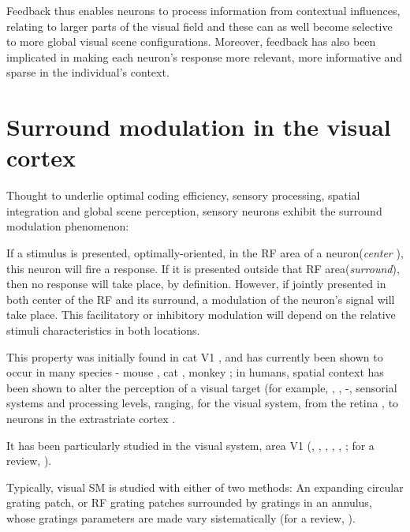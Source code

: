Feedback thus enables neurons to process information from contextual influences, relating to larger parts of the visual field and these can as well become selective to more global visual scene configurations. Moreover, feedback has also been implicated in making each neuron's response more relevant, more informative and sparse in the individual's context.



\section{Surround modulation in the visual cortex}

Thought to underlie optimal coding efficiency, sensory processing, spatial integration and global scene perception, sensory neurons exhibit the surround modulation phenomenon: 


If a stimulus is presented, optimally-oriented, in the RF area of a neuron(\textit{center} ), this neuron will fire a response. If it is presented outside that RF area(\textit{surround}), then no response will take place, by definition. However, if jointly presented in both center of the RF and its surround, a modulation of the neuron's signal will take place. This facilitatory or inhibitory modulation will depend on the relative stimuli characteristics in both locations. 

This property was initially found in cat V1 \cite{Hubel1965}, and has currently been shown to occur in many species - mouse \cite{VanDenBergh2010}, cat \cite{Blakemore1972}, monkey \cite{Cavanaugh2002a}; in humans, spatial context has been shown to alter the perception of a visual target (for example, \cite{Chubb1989}, \cite{Cannon1991}, \cite{Nurminen2009} -, sensorial systems and processing levels, ranging, for the visual system, from the retina \cite{McIlwain1964}, \cite{Solomon2006} to neurons in the extrastriate cortex \cite{Allman1985}. 

It has been particularly studied in the visual system, area V1 (\cite{Hubel1965}, \cite{Blakemore1972}, \cite{Maffei1976}, \cite{Gilbert1977}, \cite{Cavanaugh2002a}, \cite{VanDenBergh2010}; for a review, \cite{Angelucci2017}).

Typically, visual SM is studied with either of two methods: An expanding circular grating patch, or RF grating patches surrounded by gratings in an annulus, whose gratings parameters are made vary sistematically (for a review, \cite{Angelucci2017}).

